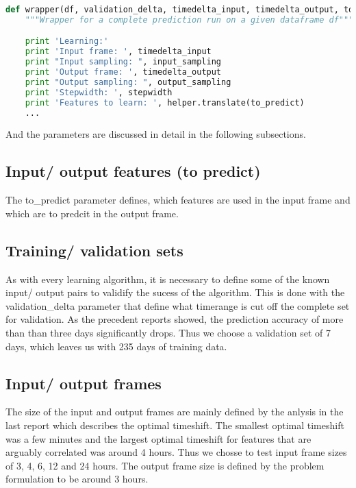 \documentclass{scrartcl}
\begin{document}
\begin{lstlisting}[language=Python]
def wrapper(df, validation_delta, timedelta_input, timedelta_output, to_predict, input_sampling, output_sampling, stepwidth):
    """Wrapper for a complete prediction run on a given dataframe df"""

    print 'Learning:'
    print 'Input frame: ', timedelta_input
    print "Input sampling: ", input_sampling
    print 'Output frame: ', timedelta_output
    print "Output sampling: ", output_sampling
    print 'Stepwidth: ', stepwidth
    print 'Features to learn: ', helper.translate(to_predict)
    ...
\end{lstlisting}

And the parameters are discussed in detail in the following subsections.


\subsection{Input/ output features (to predict)}
\label{sec:}
The to\_predict parameter defines, which features are used in the input frame and which are to predcit in the output frame.


\subsection{Training/ validation sets}
\label{sec:}
As with every learning algorithm, it is necessary to define some of the known input/ output pairs to validify the sucess of the algorithm. This is done with the validation\_delta parameter that define what timerange is cut off the complete set for validation. As the precedent reports showed, the prediction accuracy of more than than three days significantly drops. Thus we choose a validation set of 7 days, which leaves us with 235 days of training data.

\subsection{Input/ output frames}
\label{sec:}
The size of the input and output frames are mainly defined by the anlysis in the last report which describes the optimal timeshift. The smallest optimal timeshift was a few minutes and the largest optimal timeshift for features that are arguably correlated was around 4 hours. Thus we chosse to test input frame sizes of 3, 4, 6, 12 and 24 hours. The output frame size is defined by the problem formulation to be around 3 hours. 
\end{document}
